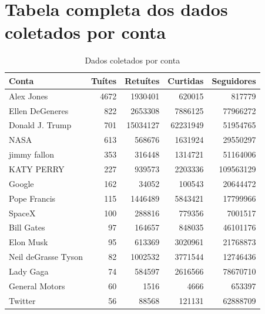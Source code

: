 \documentclass[oneside,openright,12pt]{ufsm_2015} %
\begin{document}
\anexo    %

    \chapter{Tabela completa dos dados coletados por conta}
    \label{anexo-tebela-contas}
    
    \begin{table}[ht]
    \centering
    \caption{Dados coletados por conta}
    \label{tab:todas-contas-tweets}
    \begin{tabular}{|l|r|r|r|r|}
    \hline
    \textbf{Conta}  & \multicolumn{1}{l|}{\textbf{Tuítes}} & \multicolumn{1}{l|}{\textbf{Retuítes}} & \multicolumn{1}{l|}{\textbf{Curtidas}} & \multicolumn{1}{l|}{\textbf{Seguidores}} \\ \hline
    Alex Jones 			& 4672	& 1930401	& 620015	& 817779 	\\ \hline
    Ellen DeGeneres		& 822	& 2653308	& 7886125	& 77966272 	\\ \hline
    Donald J. Trump		& 701	& 15034127	& 62231949	& 51954765 	\\ \hline
    NASA				& 613	& 568676	& 1631924	& 29550297 	\\ \hline
    jimmy fallon		& 353	& 316448	& 1314721	& 51164006 	\\ \hline
    KATY PERRY			& 227	& 939573	& 2203336	& 109563129 \\ \hline
    Google				& 162	& 34052		& 100543	& 20644472 	\\ \hline
    Pope Francis		& 115	& 1446489	& 5843421	& 17799966 	\\ \hline
    SpaceX				& 100	& 288816	& 779356	& 7001517 	\\ \hline
    Bill Gates			& 97	& 164657	& 848035	& 46101176 	\\ \hline
    Elon Musk			& 95	& 613369	& 3020961	& 21768873 	\\ \hline
    Neil deGrasse Tyson	& 82	& 1002532	& 3771544	& 12746436 	\\ \hline
    Lady Gaga			& 74	& 584597	& 2616566	& 78670710 	\\ \hline
    General Motors		& 60	& 1516		& 4666		& 653397 	\\ \hline
    Twitter				& 56	& 88568		& 121131	& 62888709 	\\ \hline

\end{tabular}
\end{table}
\end{document}
